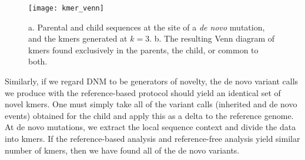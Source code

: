 \begin{figure}[h!]
  \centering
    \texttt{[image: kmer\_venn]}
  \caption{a. Parental and child sequences at the site of a \textit{de novo} mutation, and the kmers generated at $k=3$.  b. The resulting Venn diagram of kmers found exclusively in the parents, the child, or common to both.}
  \label{fig:kmer_venn}
\end{figure}

Similarly, if we regard DNM to be generators of novelty, the de novo variant calls we produce with the reference-based protocol should yield an identical set of novel kmers.  One must simply take all of the variant calls (inherited and de novo events) obtained for the child and apply this as a delta to the reference genome.  At de novo mutations, we extract the local sequence context and divide the data into kmers.  If the reference-based analysis and reference-free analysis yield similar number of kmers, then we have found all of the de novo variants.

